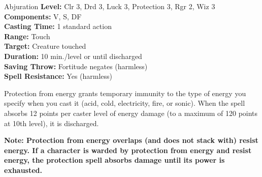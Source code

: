 {Abjuration}
{
	\textbf{Level:}
	Clr 3, Drd 3, Luck 3, Protection 3, Rgr 2, Wiz 3\\
	\textbf{Components:}
	V, S, DF\\
	\textbf{Casting Time:}
	1 standard action\\
	\textbf{Range:}
	Touch\\
	\textbf{Target:}
	Creature touched\\
	\textbf{Duration:}
	10 min./level or until discharged\\
	\textbf{Saving Throw:}
	Fortitude negates (harmless)\\
	\textbf{Spell Resistance:}
	Yes (harmless)\\
}
{
	Protection from energy grants temporary immunity to the type of energy you specify when you cast it (acid, cold, electricity, fire, or sonic). When the spell absorbs 12 points per caster level of energy damage (to a maximum of 120 points at 10th level), it is discharged.

	\textbf{Note: Protection from energy overlaps (and does not stack with) resist energy. If a character is warded by protection from energy and resist energy, the protection spell absorbs damage until its power is exhausted.}

}
